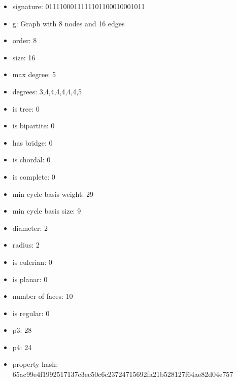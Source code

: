 \begin{itemize}
\item signature: 0111100011111101100010001011
\item g: Graph with 8 nodes and 16 edges
\item order: 8
\item size: 16
\item max degree: 5
\item degrees: 3,4,4,4,4,4,4,5
\item is tree: 0
\item is bipartite: 0
\item has bridge: 0
\item is chordal: 0
\item is complete: 0
\item min cycle basis weight: 29
\item min cycle basis size: 9
\item diameter: 2
\item radius: 2
\item is eulerian: 0
\item is planar: 0
\item number of faces: 10
\item is regular: 0
\item p3: 28
\item p4: 24
\item property hash: 65ac99e4f1992517137c3ec50c6c23724715692fa21b528127f64ae82d04e757
\end{itemize}
\newpage
\begin{figure}
\end{figure}
